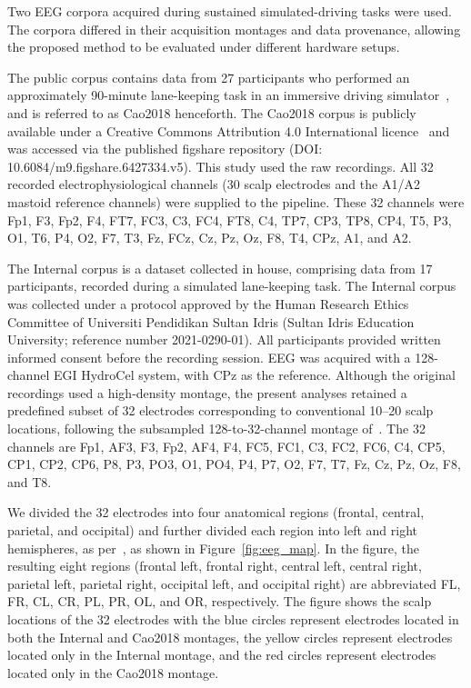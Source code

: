 Two EEG corpora acquired during sustained simulated-driving tasks were used. The corpora differed in their acquisition montages and data provenance, allowing the proposed method to be evaluated under different hardware setups.

The public corpus contains data from 27 participants who performed an approximately 90-minute lane-keeping task in an immersive driving simulator~\citep{cao2019multichannel}, and is referred to as Cao2018 henceforth. The Cao2018 corpus is publicly available under a Creative Commons Attribution 4.0 International licence~\citep{cao2019multichannel} and was accessed via the published figshare repository (DOI: 10.6084/m9.figshare.6427334.v5). This study used the raw recordings. All 32 recorded electrophysiological channels (30 scalp electrodes and the A1/A2 mastoid reference channels) were supplied to the pipeline. These 32 channels were Fp1, F3, Fp2, F4, FT7, FC3, C3, FC4, FT8, C4, TP7, CP3, TP8, CP4, T5, P3, O1, T6, P4, O2, F7, T3, Fz, FCz, Cz, Pz, Oz, F8, T4, CPz, A1, and A2.

The Internal corpus is a dataset collected in house, comprising data from 17 participants, recorded during a simulated lane-keeping task. The Internal corpus was collected under a protocol approved by the Human Research Ethics Committee of Universiti Pendidikan Sultan Idris (Sultan Idris Education University; reference number 2021-0290-01). All participants provided written informed consent before the recording session. EEG was acquired with a 128-channel EGI HydroCel system, with CPz as the reference. Although the original recordings used a high-density montage, the present analyses retained a predefined subset of 32 electrodes corresponding to conventional 10--20 scalp locations, following the subsampled 128-to-32-channel montage of~\citep{Hatlestad_2023_reliable}. The 32 channels are Fp1, AF3, F3, Fp2, AF4, F4, FC5, FC1, C3, FC2, FC6, C4, CP5, CP1, CP2, CP6, P8, P3, PO3, O1, PO4, P4, P7, O2, F7, T7, Fz, Cz, Pz, Oz, F8, and T8.

We divided the 32 electrodes into four anatomical regions (frontal, central, parietal, and occipital) and further divided each region into left and right hemispheres, as per~\citep{black2012}, as shown in Figure~\ref{fig:eeg_map}. In the figure, the resulting eight regions (frontal left, frontal right, central left, central right, parietal left, parietal right, occipital left, and occipital right) are abbreviated FL, FR, CL, CR, PL, PR, OL, and OR, respectively. The figure shows the scalp locations of the 32 electrodes with the blue circles represent electrodes located in both the Internal and Cao2018 montages, the yellow circles represent electrodes located only in the Internal montage, and the red circles represent electrodes located only in the Cao2018 montage.



